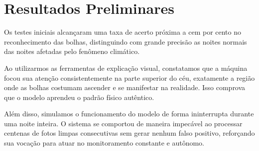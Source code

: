 \section{Resultados Preliminares}\label{sec:results}

Os testes iniciais alcançaram uma taxa de acerto próxima a cem por cento no reconhecimento das bolhas, distinguindo com grande precisão as noites normais das noites afetadas pelo fenômeno climático.

Ao utilizarmos as ferramentas de explicação visual, constatamos que a máquina focou sua atenção consistentemente na parte superior do céu, exatamente a região onde as bolhas costumam ascender e se manifestar na realidade. Isso comprova que o modelo aprendeu o padrão físico autêntico.

Além disso, simulamos o funcionamento do modelo de forma ininterrupta durante uma noite inteira. O sistema se comportou de maneira impecável ao processar centenas de fotos limpas consecutivas sem gerar nenhum falso positivo, reforçando sua vocação para atuar no monitoramento constante e autônomo.

